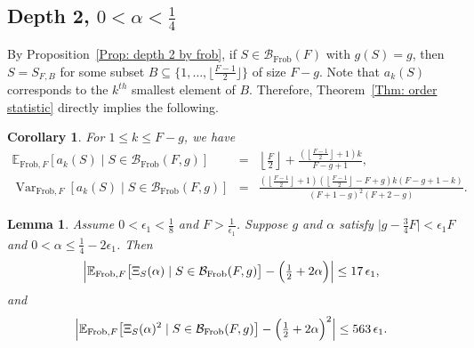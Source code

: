 \documentclass[12pt]{amsart}
\def\B{{\mathcal B}}
\def\E{{\mathbb E}}
\def\Var{{\operatorname{Var}}}
\newcommand{\Frob}{\text{Frob}}
\newtheorem{lemma}[theorem]{Lemma}
\newtheorem{corollary}[theorem]{Corollary}
\begin{document}
\subsection{Depth 2, $0<\alpha<\frac{1}{4}$}\label{Subsec: depth 2 by Frob}


By Proposition~\ref{Prop: depth 2 by frob}, if $S\in \B_{\Frob}(F)$ with $g(S)=g$, then $S=S_{F,B}$ for some subset $B\subseteq\{1,\dots,\lfloor\frac{F-1}{2}\rfloor\}$ of size $F-g$.
Note that $a_{k}(S)$ corresponds to the $k^{th}$ smallest element of $B$. Therefore, Theorem~\ref{Thm: order statistic} directly implies the following.

\begin{corollary}\label{Cor: ak depth 2 by Frob}
For $1\leq k\leq F-g$, we have
\begin{eqnarray*}
\E_{\Frob,F}[a_{k}(S)\mid S\in \B_{\Frob}(F,g)] & = & \left\lfloor\frac{F}{2}\right\rfloor+ \frac{\left(\left\lfloor\frac{F-1}{2}\right\rfloor+1\right)k}{F-g+1},\\
\Var_{\Frob, F}[a_{k}(S)\mid S\in \B_{\Frob}(F,g)] & = & \frac{\left(\left\lfloor\frac{F-1}{2}\right\rfloor+1\right)\left(\left\lfloor\frac{F-1}{2}\right\rfloor-F+g\right) k (F-g+1-k)}{(F+1-g)^2 (F+2-g)}.
\end{eqnarray*}
\end{corollary}

\begin{lemma}\label{Lem: exp, var depth 2 by Frob}
Assume $0<\epsilon_1<\tfrac18$ and $F>\tfrac{1}{\epsilon_1}$. Suppose $g$ and $\alpha$ satisfy $\big|g-\tfrac{3}{4} F\big|<\epsilon_1 F$ and $0< \alpha \le \tfrac14-2\epsilon_1$. Then
\[
\Bigl|\E_{\Frob,F}\big[\Xi_S(\alpha)\mid S\in\mathcal B_{\Frob}(F,g)\big]-\Big(\tfrac{1}{2}+2\alpha\Big)\Bigr|
\le 17\,\epsilon_1,
\]
and
\[
\Bigl|\E_{\Frob,F}\big[\Xi_S(\alpha)^2\mid S\in\mathcal B_{\Frob}(F,g)\big]-\Big(\tfrac{1}{2}+2\alpha\Big)^2\Bigr|
\le 563\,\epsilon_1.
\]
\end{lemma}
\end{document}
